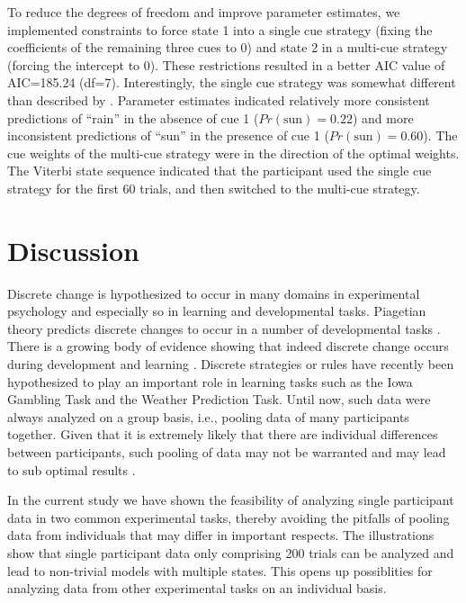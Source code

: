 \documentclass[a4paper,12pt,man]{apa} %
\newcommand{\citep}{\cite}
\newcommand{\citet}{\citeA}
\begin{document}
To reduce the degrees of freedom and improve parameter estimates, we
implemented constraints to force state 1 into a single cue strategy
(fixing the coefficients of the remaining three cues to 0) and state 2
in a multi-cue strategy (forcing the intercept to 0).  These
restrictions resulted in a better AIC value of AIC=185.24 (df=7).
Interestingly, the single cue strategy was somewhat different than
described by \citet{Gluck2002}.  Parameter estimates indicated relatively
more consistent predictions of ``rain'' in the absence of cue 1
($Pr(\text{sun}) = 0.22$) and more inconsistent predictions of ``sun''
in the presence of cue 1 ($Pr(\text{sun}) = 0.60$).  The cue weights
of the multi-cue strategy were in the direction of the optimal
weights.  The Viterbi state sequence indicated that the participant
used the single cue strategy for the first 60 trials, and then
switched to the multi-cue strategy.


\section{Discussion}

Discrete change is hypothesized to occur in many domains in
experimental psychology and especially so in learning and
developmental tasks.  Piagetian theory predicts discrete changes to
occur in a number of developmental tasks \citep{Inhelder1958}.  There
is a growing body of evidence showing that indeed discrete change
occurs during development and learning
\citep{Jansen2001b,Maas1992,Raijmakers2001,Schmittmann2006}.  Discrete
strategies or rules have recently been hypothesized to play an
important role in learning tasks such as the Iowa Gambling Task and
the Weather Prediction Task.  Until now, such data were always
analyzed on a group basis, i.e., pooling data of many participants
together.  Given that it is extremely likely that there are individual
differences between participants, such pooling of data may not be
warranted and may lead to sub optimal results \citep{Molenaar2005}. 

In the current study we have shown the feasibility of analyzing single
participant data in two common experimental tasks, thereby avoiding
the pitfalls of pooling data from individuals that may differ in
important respects.  The illustrations show that single participant
data only comprising 200 trials can be analyzed and lead to
non-trivial models with multiple states.  This opens up possiblities
for analyzing data from other experimental tasks on an individual
basis.
\end{document}
